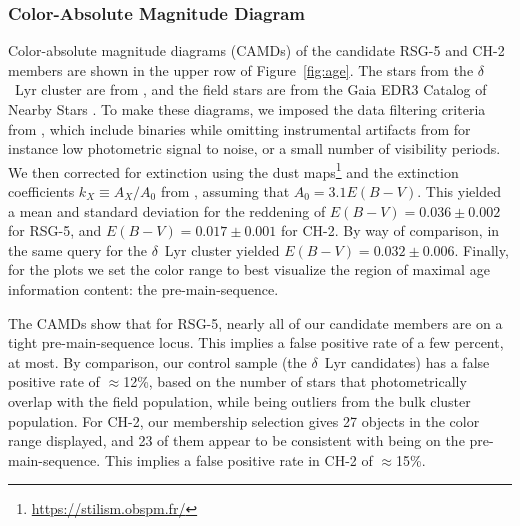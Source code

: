 \documentclass[12pt,twocolumn]{aastex63}
\begin{document}
\subsubsection{Color-Absolute Magnitude Diagram}
\label{sec:camd}

Color-absolute magnitude diagrams (CAMDs) of the candidate RSG-5 and
CH-2 members are shown in the upper row of Figure~\ref{fig:age}.  The
stars from the $\delta$~Lyr cluster are from
\citet{bouma_kep1627_2022}, and the field stars are from the Gaia EDR3
Catalog of Nearby Stars \citep{gaia_gcns_2021}.  To make these
diagrams, we imposed the data filtering criteria from
\citet[][Appendix B]{GaiaCollaboration2018}, which 
include binaries while omitting instrumental artifacts from for
instance low photometric signal to noise, or a small number of
visibility periods.  We then corrected for extinction using the
\citet{lallement_threedimensional_2018}
dust maps\footnote{\url{https://stilism.obspm.fr/}} and the extinction coefficients $k_X\equiv A_X/A_0$ from
\citet{GaiaCollaboration2018}, assuming that $A_0 = 3.1 E(B-V)$.  This
yielded a mean and standard deviation for the reddening of
$E(B-V)=0.036\pm0.002$ for RSG-5, and $E(B-V)=0.017\pm0.001$
for CH-2.  By way of comparison, in \citet{bouma_kep1627_2022} the
same query for the $\delta$~Lyr cluster yielded
$E(B-V)=0.032\pm0.006$.  Finally, for the plots we set the
color range to best visualize the region of maximal age information
content: the pre-main-sequence.

The CAMDs show that for RSG-5, nearly all of our candidate members are
on a tight pre-main-sequence locus.  This implies a false positive
rate of a few percent, at most.  By comparison, our control sample
(the $\delta$~Lyr candidates) has a false positive rate of
$\approx$12\%, based on the number of stars that photometrically
overlap with the field population, while being outliers from the bulk cluster
population.  For CH-2, our membership selection gives 27 objects in
the color range displayed, and 23 of them appear to be consistent with
being on the pre-main-sequence.  This implies a false positive rate in
CH-2 of $\approx$15\%.
\end{document}
